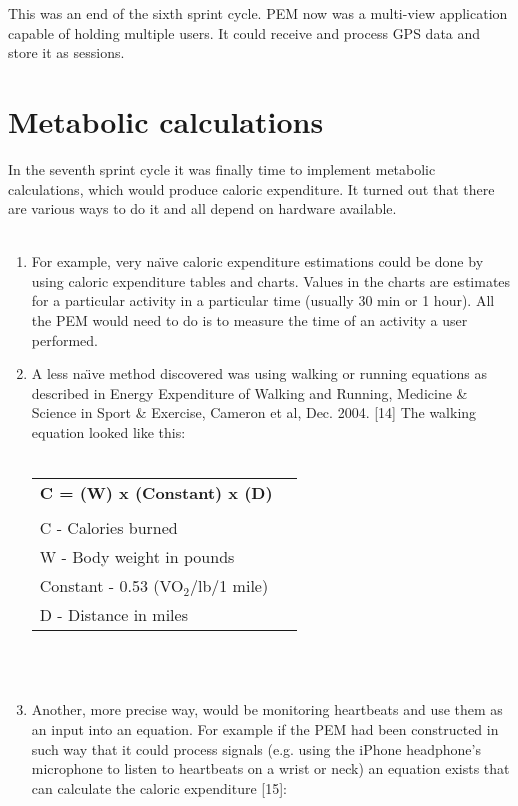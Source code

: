 \documentclass[12pt, a4paper]{report}   %
\begin{document}
\begin{enumerate}
This was an end of the sixth sprint cycle. PEM now was a multi-view application capable of holding multiple users. It could receive and process GPS data and store it as sessions.


\clearpage
\section{Metabolic calculations}
In the seventh sprint cycle it was finally time to implement metabolic calculations, which would produce caloric expenditure. It turned out that there are various ways to do it and all depend on hardware available.\\ \\

\begin{enumerate}
	\item For example, very na\"\i ve caloric expenditure estimations could be done by using caloric expenditure tables and charts. Values in the charts are estimates for a particular activity in a particular time (usually 30 min or 1 hour). All the PEM would need to do is to measure the time of an activity a user performed.\\
	\item A less na\"\i ve method discovered was using walking or running equations as described in Energy Expenditure of Walking and Running, Medicine \& Science in Sport \& Exercise, Cameron et al, Dec. 2004. [14] The walking equation looked like this:\\ \\

\begin{tabular}{ll}
\textbf{C = (W) x (Constant) x (D)}\\ \\
C - Calories burned\\
W - Body weight in pounds\\
Constant - 0.53 (VO$_{2}$/lb/1 mile)\\
D - Distance in miles\\
\end{tabular}\\ \\


	\item Another, more precise way, would be monitoring heartbeats and use them as an input into an equation. For example if the PEM had been constructed in such way that it could process signals (e.g. using the iPhone headphone's microphone to listen to heartbeats on a wrist or neck) an equation exists that can calculate the caloric expenditure [15]:\\ \\



\end{enumerate}
\end{enumerate}
\end{document}
